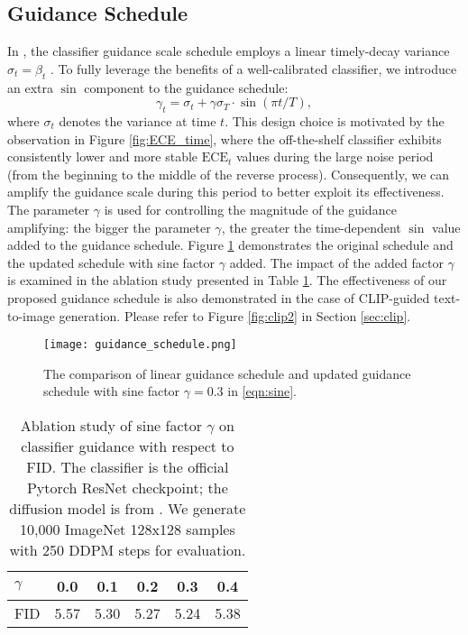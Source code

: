 \documentclass{article}
\theoremstyle{definition}
\begin{document}
\subsection{Guidance Schedule}
In \cite{dhariwal2021diffusion}, the classifier guidance scale schedule employs a linear timely-decay variance $\sigma_t = \beta_t$ \citep{ho2020denoising}.
To fully leverage the benefits of a well-calibrated classifier, we introduce an extra $\sin$ component to the guidance schedule: \begin{equation}\label{eqn:sine}
    \gamma_t = \sigma_t + \gamma \sigma_T \cdot \sin(\pi t/T),
\end{equation}  
where $\sigma_t$ denotes the variance at time $t$.  
This design choice is motivated by the observation in Figure \ref{fig:ECE_time}, where the off-the-shelf classifier exhibits consistently lower and more stable $\text{ECE}_t$ values during the large noise period (from the beginning to the middle of the reverse process). Consequently, we can amplify the guidance scale during this period to better exploit its effectiveness. The parameter $\gamma$ is used for controlling the magnitude of the guidance amplifying: the bigger the parameter $\gamma$, the greater the time-dependent $\sin$ value added to the guidance schedule. 
Figure \ref{fig:guidance_schedule} demonstrates the original schedule and the updated schedule with sine factor $\gamma$ added. The impact of the added factor $\gamma$ is examined in the ablation study presented in Table \ref{table:ablation_gamma}. 
The effectiveness of our proposed guidance schedule is also demonstrated in the case of CLIP-guided text-to-image generation. Please refer to Figure \ref{fig:clip2} in Section \ref{sec:clip}.


\begin{figure}[h]
  \centering
\texttt{[image: guidance\_schedule.png]}
  \caption{The comparison of linear guidance schedule and updated guidance schedule with sine factor $\gamma=0.3$ in \eqref{eqn:sine}.}
  \label{fig:guidance_schedule}
\end{figure}


\begin{table}[h!]
\caption{Ablation study of sine factor $\gamma$ on classifier guidance with respect to FID. The classifier is the official Pytorch ResNet checkpoint; the diffusion model is from \cite{dhariwal2021diffusion}. We generate 10,000 ImageNet 128x128 samples with 250 DDPM steps for evaluation.}
\label{table:ablation_gamma}
\begin{center}
\begin{small}
\begin{sc}
\begin{tabular}{lccccc}
\toprule
$\gamma$   & 0.0 & 0.1 & 0.2 & 0.3 & 0.4  \\
\midrule
FID     & 5.57 & 5.30 & 5.27 & 5.24 & 5.38 \\

\bottomrule
\end{tabular}
\end{sc}
\end{small}
\end{center}
\end{table}
\end{document}
